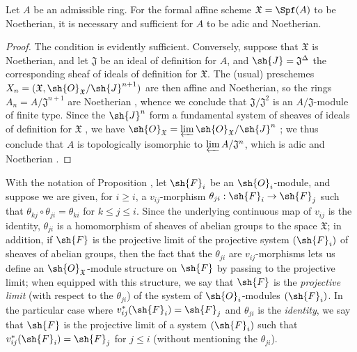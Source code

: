 \begin{corollary}[10.6.5]
\label{I.10.6.5}
Let $A$ be an admissible ring.
For the formal affine scheme $\mathfrak{X}=\Spf(A)$ to be Noetherian, it is necessary and sufficient for $A$ to be adic and Noetherian.
\end{corollary}

\begin{proof}
The condition is evidently sufficient.
Conversely, suppose that $\mathfrak{X}$ is Noetherian, and let $\mathfrak{J}$ be an ideal of definition for $A$, and $\sh{J}=\mathfrak{J}^\Delta$ the corresponding sheaf of ideals of definition for $\mathfrak{X}$.
The (usual) preschemes $X_n=(\mathfrak{X},\sh{O}_\mathfrak{X}/\sh{J}^{n+1})$ are then affine and Noetherian, so the rings $A_n=A/\mathfrak{J}^{n+1}$ are Noetherian , whence we conclude that $\mathfrak{J}/\mathfrak{J}^2$ is an $A/\mathfrak{J}$-module of finite type.
Since the $\sh{J}^n$ form a fundamental system of sheaves of ideals of definition for $\mathfrak{X}$ , we have $\sh{O}_\mathfrak{X}=\varprojlim\sh{O}_\mathfrak{X}/\sh{J}^n$ ; we thus conclude  that $A$ is topologically isomorphic to $\varprojlim A/\mathfrak{J}^n$, which is adic and Noetherian .
\end{proof}

\begin{remark}[10.6.6]
\label{I.10.6.6}
With the notation of Proposition , let $\sh{F}_i$ be an $\sh{O}_i$-module, and suppose we are given, for $i\geq i$, a $v_{ij}$-morphism $\theta_{ji}:\sh{F}_i\to\sh{F}_j$ such that $\theta_{kj}\circ\theta_{ji}=\theta_{ki}$ for $k\leq j\leq i$.
Since the underlying continuous map of $v_{ij}$ is the identity, $\theta_{ji}$ is a homomorphism of sheaves of abelian groups to the space $\mathfrak{X}$; in addition, if $\sh{F}$ is the projective limit of the projective system $(\sh{F}_i)$ of sheaves of abelian groups, then the fact that the $\theta_{ji}$ are $v_{ij}$-morphisms lets us define an $\sh{O}_\mathfrak{X}$-module structure on $\sh{F}$ by passing to the projective limit; when equipped with this structure, we say that $\sh{F}$ is the \emph{projective limit} (with respect to the $\theta_{ji}$) of the system of $\sh{O}_i$-modules $(\sh{F}_i)$.
In the particular case where $v_{ij}^*(\sh{F}_i)=\sh{F}_j$ and $\theta_{ji}$ is the \emph{identity}, we say that $\sh{F}$ is the projective limit of a system $(\sh{F}_i)$ such that $v_{ij}^*(\sh{F}_i)=\sh{F}_j$ for $j\leq i$ (without mentioning the $\theta_{ji}$).
\end{remark}

